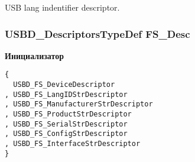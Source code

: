 USB lang indentifier descriptor. \hypertarget{group___u_s_b_d___d_e_s_c___private___variables_ge36d67393118d9d8531a8d633e23a797}{
\subsubsection[{FS\_\-Desc}]{\setlength{\rightskip}{0pt plus 5cm}USBD\_\-DescriptorsTypeDef FS\_\-Desc}}
\label{group___u_s_b_d___d_e_s_c___private___variables_ge36d67393118d9d8531a8d633e23a797}


\textbf{Инициализатор}

\begin{Code}\begin{verbatim}
{
  USBD_FS_DeviceDescriptor
, USBD_FS_LangIDStrDescriptor
, USBD_FS_ManufacturerStrDescriptor
, USBD_FS_ProductStrDescriptor
, USBD_FS_SerialStrDescriptor
, USBD_FS_ConfigStrDescriptor
, USBD_FS_InterfaceStrDescriptor
}
\end{verbatim}
\end{Code}
